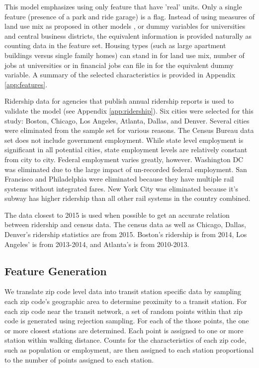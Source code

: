 \documentclass{article}
\begin{document}
This model emphasizes using only feature that have 'real' units. Only a single feature (presence of a park and ride garage) is a flag. Instead of using measures of land use mix as proposed in other models \cite{Durning2015, Gutierrez2011}, or dummy variables for universities and central business districts, the equivalent information is provided naturally as counting data in the feature set. Housing types (such as large apartment buildings versus single family homes) can stand in for land use mix, number of jobs at universities or in financial jobs can file in for the equivalent dummy variable. A summary of the selected characteristics is provided in Appendix \ref{app:features}.

Ridership data for agencies that publish annual ridership reports is used to validate the model (see Appendix \ref{app:ridership}). Six cities were selected for this study: Boston, Chicago, Los Angeles, Atlanta, Dallas, and Denver. Several cities were eliminated from the sample set for various reasons. The Census Bureau data set does not include government employment. While state level employment is significant in all potential cities, state employment levels are relatively constant from city to city. Federal employment varies greatly, however. Washington DC was eliminated due to the large impact of un-recorded federal employment. San Francisco and Philadelphia were eliminated because they have multiple rail systems without integrated fares. New York City was eliminated because it's subway has higher ridership than all other rail systems in the country combined. 

The data closest to 2015 is used when possible to get an accurate relation between ridership and census data. The census data as well as Chicago, Dallas, Denver's ridership statistics are from 2015. Boston's ridership is from 2014, Los Angeles' is from 2013-2014, and Atlanta's is from 2010-2013. 



\subsection{Feature Generation}

We translate zip code level data into transit station specific data by sampling each zip code's geographic area to determine proximity to a transit station. For each zip code near the transit network, a set of random points within that zip code is generated using rejection sampling. For each of the those points, the one or more closest stations are determined. Each point is assigned to one or more station within walking distance. Counts for the characteristics of each zip code, such as population or employment, are then assigned to each station proportional to the number of points assigned to each station.
\end{document}
